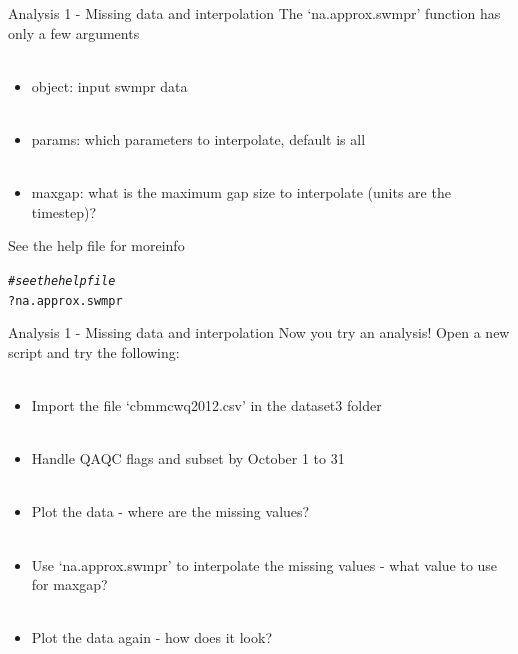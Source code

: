 \documentclass[xcolor=svgnames]{beamer}\usepackage[]{graphicx}\usepackage[]{color}
\makeatletter
\newcommand{\hlcom}[1]{\textcolor[rgb]{0.678,0.584,0.686}{\textit{#1}}}%
\newcommand{\hlopt}[1]{\textcolor[rgb]{0,0,0}{#1}}%
\newcommand{\hlstd}[1]{\textcolor[rgb]{0.345,0.345,0.345}{#1}}%
\newenvironment{kframe}{%
 \def\at@end@of@kframe{}%
 \ifinner\ifhmode%
  \def\at@end@of@kframe{\end{minipage}}%
  \begin{minipage}{\columnwidth}%
 \fi\fi%
 \def\FrameCommand##1{\hskip\@totalleftmargin \hskip-\fboxsep
 \colorbox{shadecolor}{##1}\hskip-\fboxsep
     \hskip-\linewidth \hskip-\@totalleftmargin \hskip\columnwidth}%
 \MakeFramed {\advance\hsize-\width
   \@totalleftmargin\z@ \linewidth\hsize
   \@setminipage}}%
 {\par\unskip\endMakeFramed%
 \at@end@of@kframe}
\newenvironment{knitrout}{}{} %
\makeatother
\begin{document}
\begin{frame}[containsverbatim]{Analysis 1 - Missing data and interpolation}
The `na.approx.swmpr' function has only a few arguments\\~\\
\begin{itemize}
\item object: input swmpr data \\~\\
\item params: which parameters to interpolate, default is all \\~\\
\item maxgap: what is the maximum gap size to interpolate (units are the timestep)?
\end{itemize}
See the help file for moreinfo
\begin{knitrout}\scriptsize
{}\color{fgcolor}\begin{kframe}
\begin{alltt}
\hlcom{# see the help file}
\hlopt{?}\hlstd{na.approx.swmpr}
\end{alltt}
\end{kframe}
\end{knitrout}
\end{frame}

\begin{frame}[containsverbatim]{Analysis 1 - Missing data and interpolation}
Now you try an analysis! Open a new script and try the following: \\~\\
\begin{itemize}
\item Import the file `cbmmcwq2012.csv' in the dataset3 folder \\~\\
\item Handle QAQC flags and subset by October 1 to 31 \\~\\
\item Plot the data - where are the missing values?\\~\\
\item Use `na.approx.swmpr' to interpolate the missing values - what value to use for maxgap?\\~\\
\item Plot the data again - how does it look?
\end{itemize}
\end{frame}
\end{document}
